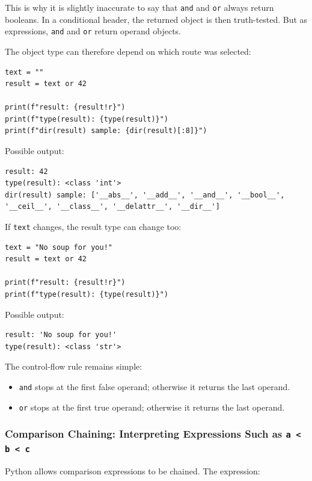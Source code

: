 This is why it is slightly inaccurate to say that \texttt{and} and \texttt{or} always return booleans. In a conditional header, the returned object is then truth-tested. But as expressions, \texttt{and} and \texttt{or} return operand objects.

The object type can therefore depend on which route was selected:

\begin{verbatim}
text = ""
result = text or 42

print(f"result: {result!r}")
print(f"type(result): {type(result)}")
print(f"dir(result) sample: {dir(result)[:8]}")
\end{verbatim}

Possible output:

\begin{verbatim}
result: 42
type(result): <class 'int'>
dir(result) sample: ['__abs__', '__add__', '__and__', '__bool__', '__ceil__', '__class__', '__delattr__', '__dir__']
\end{verbatim}

If \texttt{text} changes, the result type can change too:

\begin{verbatim}
text = "No soup for you!"
result = text or 42

print(f"result: {result!r}")
print(f"type(result): {type(result)}")
\end{verbatim}

Possible output:

\begin{verbatim}
result: 'No soup for you!'
type(result): <class 'str'>
\end{verbatim}

The control-flow rule remains simple:

\begin{itemize}
    \item \texttt{and} stops at the first false operand; otherwise it returns the last operand.
    \item \texttt{or} stops at the first true operand; otherwise it returns the last operand.
\end{itemize}

\subsubsection{Comparison Chaining: Interpreting Expressions Such as \texttt{a < b < c}}

Python allows comparison expressions to be chained. The expression:

